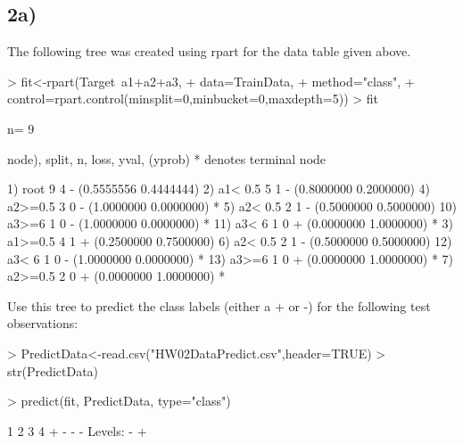 \documentclass{article}
\begin{document}
\subsection*{2a)}
The following tree was created using rpart for the data table given above.
\begin{Schunk}
\begin{Sinput}
> fit<-rpart(Target~a1+a2+a3, 
+       data=TrainData, 
+       method="class",
+       control=rpart.control(minsplit=0,minbucket=0,maxdepth=5))
> fit
\end{Sinput}
\begin{Soutput}
n= 9 

node), split, n, loss, yval, (yprob)
      * denotes terminal node

 1) root 9 4 - (0.5555556 0.4444444)  
   2) a1< 0.5 5 1 - (0.8000000 0.2000000)  
     4) a2>=0.5 3 0 - (1.0000000 0.0000000) *
     5) a2< 0.5 2 1 - (0.5000000 0.5000000)  
      10) a3>=6 1 0 - (1.0000000 0.0000000) *
      11) a3< 6 1 0 + (0.0000000 1.0000000) *
   3) a1>=0.5 4 1 + (0.2500000 0.7500000)  
     6) a2< 0.5 2 1 - (0.5000000 0.5000000)  
      12) a3< 6 1 0 - (1.0000000 0.0000000) *
      13) a3>=6 1 0 + (0.0000000 1.0000000) *
     7) a2>=0.5 2 0 + (0.0000000 1.0000000) *
\end{Soutput}
\end{Schunk}
Use this tree to predict the class labels (either a + or -) for the following test
observations:
\begin{Schunk}
\begin{Sinput}
> PredictData<-read.csv("HW02DataPredict.csv",header=TRUE)
> str(PredictData)
\end{Sinput}
\begin{Sinput}
> predict(fit, PredictData, type="class")
\end{Sinput}
\begin{Soutput}
1 2 3 4 
+ - - - 
Levels: - +
\end{Soutput}
\end{Schunk}
\end{document}
